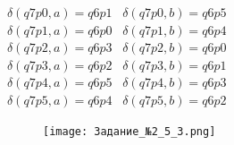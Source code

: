 \documentclass[a4paper]{article}
\begin{document}
\begin{enumerate}
$\delta(q7p0, a) = q6p1$ \  $\delta(q7p0, b) = q6p5$ \\
$\delta(q7p1, a) = q6p0$ \  $\delta(q7p1, b) = q6p4$ \\
$\delta(q7p2, a) = q6p3$ \  $\delta(q7p2, b) = q6p0$ \\
$\delta(q7p3, a) = q6p2$ \  $\delta(q7p3, b) = q6p1$ \\
$\delta(q7p4, a) = q6p5$ \  $\delta(q7p4, b) = q6p3$ \\
$\delta(q7p5, a) = q6p4$ \  $\delta(q7p5, b) = q6p2$ \\
\begin{figure}[h]
\centering
\texttt{[image: Задание\_№2\_5\_3.png]}
\end{figure}


\end{enumerate}
\newpage

\newpage
\end{document}
